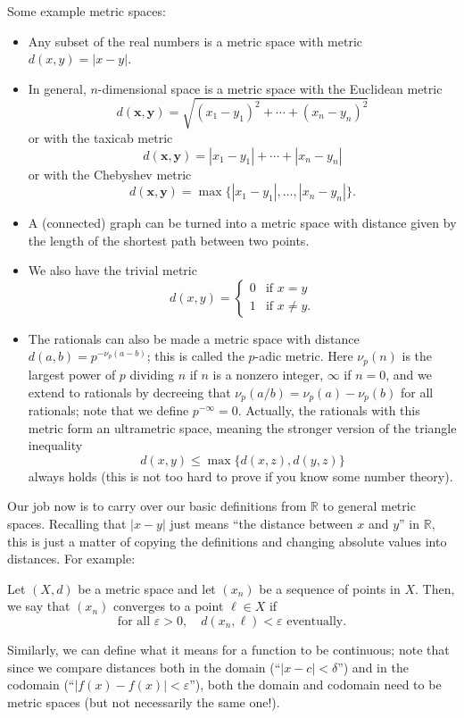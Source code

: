 \documentclass[10pt]{scrartcl}
\providecommand{\eps}{\varepsilon}
\providecommand{\RR}{\mathbb R}
\providecommand{\ii}{\item}
\providecommand{\mb}[1]{\mathbf{#1}}
\begin{document}
\begin{example}
	Some example metric spaces:
	\begin{itemize}
		\ii Any subset of the real numbers is a metric space
		with metric $d(x, y) = |x - y|$.
		\ii In general, $n$-dimensional space is a metric space
		with the Euclidean metric
		\[d(\mb x, \mb y) = \sqrt{(x_1-y_1)^2 + \cdots + (x_n - y_n)^2}\]
		or with the taxicab metric
		\[d(\mb x, \mb y) = |x_1 - y_1| + \cdots + |x_n - y_n|\]
		or with the Chebyshev metric
		\[d(\mb x, \mb y) = \max\{|x_1 - y_1|, \dots, |x_n - y_n|\}.\]
		\ii A (connected) graph can be turned into a metric space
		with distance given by the length of the shortest path
		between two points.
		\ii We also have the trivial metric
		\[d(x, y) = \begin{cases}
			0 & \text{if }x=y\\
			1 & \text{if }x\ne y.
		\end{cases}\]
		\ii The rationals can also be made a metric space
		with distance $d(a,b) = p^{-\nu_p(a-b)}$;
		this is called the $p$-adic metric.
		Here $\nu_p(n)$ is the largest power of $p$ dividing $n$
		if $n$ is a nonzero integer, $\infty$ if $n = 0$,
		and we extend to rationals by decreeing that
		$\nu_p(a/b) = \nu_p(a) - \nu_p(b)$ for all rationals;
		note that we define $p^{-\infty} = 0$.
		Actually, the rationals with this metric form an ultrametric space,
		meaning the stronger version of the triangle inequality
		\[d(x,y) \le \max\{d(x, z), d(y, z)\}\]
		always holds (this is not too hard to prove
		if you know some number theory).
	\end{itemize}
\end{example}

Our job now is to carry over our basic definitions
from $\RR$ to general metric spaces.
Recalling that $|x - y|$ just means ``the distance between $x$ and $y$''
in $\RR$, this is just a matter of copying the definitions and
changing absolute values into distances. For example:

\begin{definition}[Convergence]\label{wk7:def:convergence}
	Let $(X, d)$ be a metric space
	and let $(x_n)$ be a sequence of points in $X$.
	Then, we say that $(x_n)$ converges to a point $\ell\in X$ if
	\[\text{for all }\eps > 0,\quad d(x_n,\ell) < \eps\text{ eventually.}\]
\end{definition}

Similarly, we can define what it means for a function to be continuous;
note that since we compare distances both in the domain (``$|x - c| < \delta$'')
and in the codomain (``$|f(x) - f(x)| < \eps$''),
both the domain and codomain need to be metric spaces
(but not necessarily the same one!).
\end{document}
